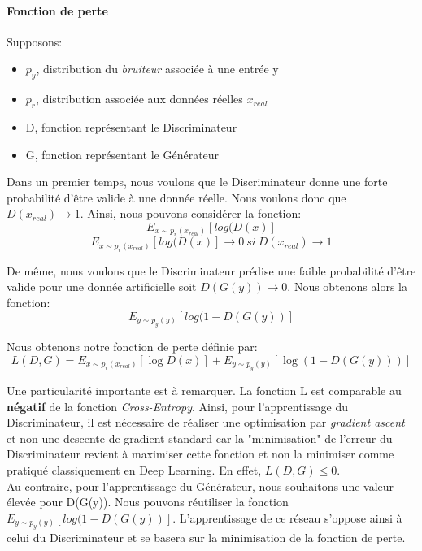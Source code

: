 \paragraph{Fonction de perte}

\noindent Supposons:
\begin{itemize}
    \item $p_y$, distribution du \textit{bruiteur} associée à une entrée y
    \item $p_r$, distribution associée aux données réelles $x_{real}$
    \item D, fonction représentant le Discriminateur
    \item G, fonction représentant le Générateur
\end{itemize}

\noindent Dans un premier temps, nous voulons que le Discriminateur donne une forte probabilité d'être valide à une donnée réelle. Nous voulons donc que $D(x_{real}) \rightarrow 1$. Ainsi, nous pouvons considérer la fonction:
$$E_{x \sim p_r(x_{real})}[log(D(x)]$$
$$E_{x \sim p_r(x_{real})}[log(D(x)] \rightarrow 0 \  si \  D(x_{real}) \rightarrow 1$$

\noindent De même, nous voulons que le Discriminateur prédise une faible probabilité d'être valide pour une donnée artificielle soit $D(G(y)) \rightarrow 0$. Nous obtenons alors la fonction:
$$E_{y \sim p_y(y)}[log(1-D(G(y))]$$

\noindent Nous obtenons notre fonction de perte définie par:
$$L(D,G)={E}_{x \sim p_{r}(x_{real})} [\log D(x)] + {E}_{y \sim p_y(y)} [\log(1 - D(G(y)))]$$

\noindent Une particularité importante est à remarquer. La fonction L est comparable au \textbf{négatif} de la fonction \textit{Cross-Entropy}. Ainsi, pour l'apprentissage du Discriminateur, il est nécessaire de réaliser une optimisation par \textit{gradient ascent} et non une descente de gradient standard car la "minimisation" de l'erreur du Discriminateur revient à maximiser cette fonction et non la minimiser comme pratiqué classiquement en Deep Learning. En effet, $L(D,G) \leq 0$.\\

\noindent Au contraire, pour l'apprentissage du Générateur, nous souhaitons une valeur élevée pour D(G(y)). Nous pouvons réutiliser la fonction $E_{y \sim p_y(y)}[log(1-D(G(y))]$. L'apprentissage de ce réseau s'oppose ainsi à celui du Discriminateur et se basera sur la minimisation de la fonction de perte.\\

